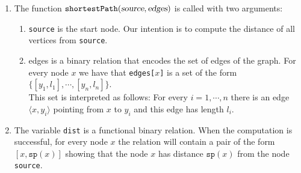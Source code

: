 \noindent
\begin{enumerate}
\item The function $\mathtt{shortestPath}(\textsl{source}, \textsl{edges})$ is called with two arguments:
      \begin{enumerate}
      \item \texttt{source} is the start node.  Our intention is to compute the distance of all
            vertices from \texttt{source}.
      \item \texttt{}{edges} is a binary relation that encodes the set of edges of the graph.  For
            every node $x$ we have that \texttt{edges[$x$]} is a set of the form
            \\[0.2cm]
            \hspace*{1.3cm}
            $\{ [y_1, l_1], \cdots, [y_n, l_n] \}$.
            \\[0.2cm]
            This set is interpreted as follows: For every $i = 1,\cdots,n$ there is an edge
            $\langle x, y_i \rangle$ pointing from $x$ to $y_i$ and this edge has length $l_i$.
      \end{enumerate}
\item The variable \texttt{dist} is a functional binary relation.  When the computation is
      successful, for every node $x$ the relation will contain a pair of the form
      $[x, \mathtt{sp}(x)]$ showing that the node $x$ has distance $\mathtt{sp}(x)$ from the node \texttt{source}.


\end{enumerate}
